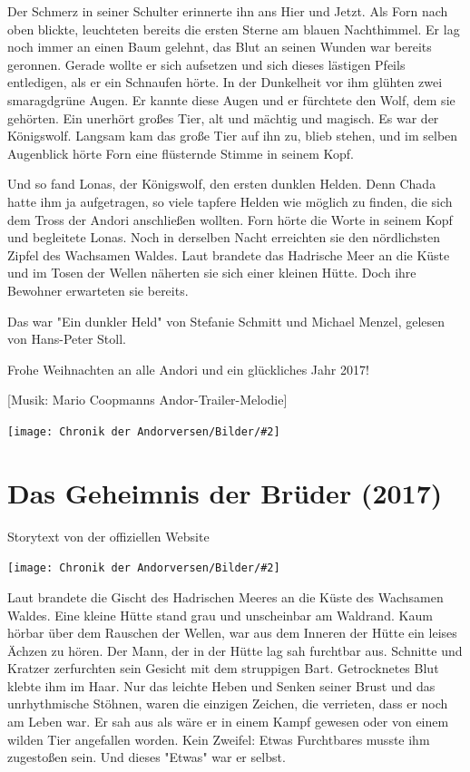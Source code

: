 \documentclass[10pt, a4paper, oneside]{book}
\newcommand{\fillbreak}{\vspace*{\fill}\columnbreak}
\newcommand{\storytext}[1]{%
    \section{#1}%
    \label{Storytext: #1}%
}
\newcommand{\bildmitts}[2][height=0.32\textwidth,width=0.48\textwidth,keepaspectratio]{%
    \begin{center}
        \texttt{[image: Chronik der Andorversen/Bilder/\#2]}
    \end{center}
}
\begin{document}
\begin{multicols}{2}
Der Schmerz in seiner Schulter erinnerte ihn ans Hier und Jetzt. Als Forn nach oben blickte, leuchteten bereits die ersten Sterne am blauen Nachthimmel. Er lag noch immer an einen Baum gelehnt, das Blut an seinen Wunden war bereits geronnen. Gerade wollte er sich aufsetzen und sich dieses lästigen Pfeils entledigen, als er ein Schnaufen hörte. In der Dunkelheit vor ihm glühten zwei smaragdgrüne Augen. Er kannte diese Augen und er fürchtete den Wolf, dem sie gehörten. Ein unerhört großes Tier, alt und mächtig und magisch. Es war der Königswolf. Langsam kam das große Tier auf ihn zu, blieb stehen, und im selben Augenblick hörte Forn eine flüsternde Stimme in seinem Kopf.

Und so fand Lonas, der Königswolf, den ersten dunklen Helden. Denn Chada hatte ihm ja aufgetragen, so viele tapfere Helden wie möglich zu finden, die sich dem Tross der Andori anschließen wollten. Forn hörte die Worte in seinem Kopf und begleitete Lonas. Noch in derselben Nacht erreichten sie den nördlichsten Zipfel des Wachsamen Waldes. Laut brandete das Hadrische Meer an die Küste und im Tosen der Wellen näherten sie sich einer kleinen Hütte. Doch ihre Bewohner erwarteten sie bereits.\bigskip

Das war "Ein dunkler Held" von Stefanie Schmitt und Michael Menzel, gelesen von Hans-Peter Stoll.

Frohe Weihnachten an alle Andori und ein glückliches Jahr 2017!

[Musik: Mario Coopmanns Andor-Trailer-Melodie]

\bildmitts{Wallpaper Forn.jpg}





\fillbreak
\storytext{Das Geheimnis der Brüder (2017)}

\begin{center}
    Storytext von der offiziellen Website
\end{center}


\bildmitts{Das Geheimnis der Brüder (2017).jpeg}

Laut brandete die Gischt des Hadrischen Meeres an die Küste des Wachsamen Waldes. Eine kleine Hütte stand grau und unscheinbar am Waldrand. Kaum hörbar über dem Rauschen der Wellen, war aus dem Inneren der Hütte ein leises Ächzen zu hören. Der Mann, der in der Hütte lag sah furchtbar aus. Schnitte und Kratzer zerfurchten sein Gesicht mit dem struppigen Bart. Getrocknetes Blut klebte ihm im Haar. Nur das leichte Heben und Senken seiner Brust und das unrhythmische Stöhnen, waren die einzigen Zeichen, die verrieten, dass er noch am Leben war. Er sah aus als wäre er in einem Kampf gewesen oder von einem wilden Tier angefallen worden. Kein Zweifel: Etwas Furchtbares musste ihm zugestoßen sein. Und dieses "Etwas" war er selbst.


\end{multicols}
\end{document}
